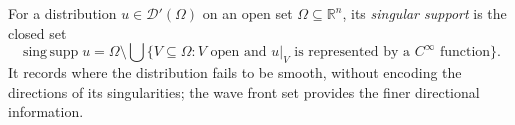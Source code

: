 
For a distribution $u\in\mathcal D'(\Omega)$ on an open set $\Omega\subseteq\mathbb R^n$, its \emph{singular support} is the closed set
\[
\operatorname{sing\,supp}u=\Omega\setminus\bigcup\{V\subseteq\Omega:V\text{ open and }u|_V\text{ is represented by a }C^\infty\text{ function}\}.
\]
It records where the distribution fails to be smooth, without encoding the directions of its singularities; the wave front set provides the finer directional information.

